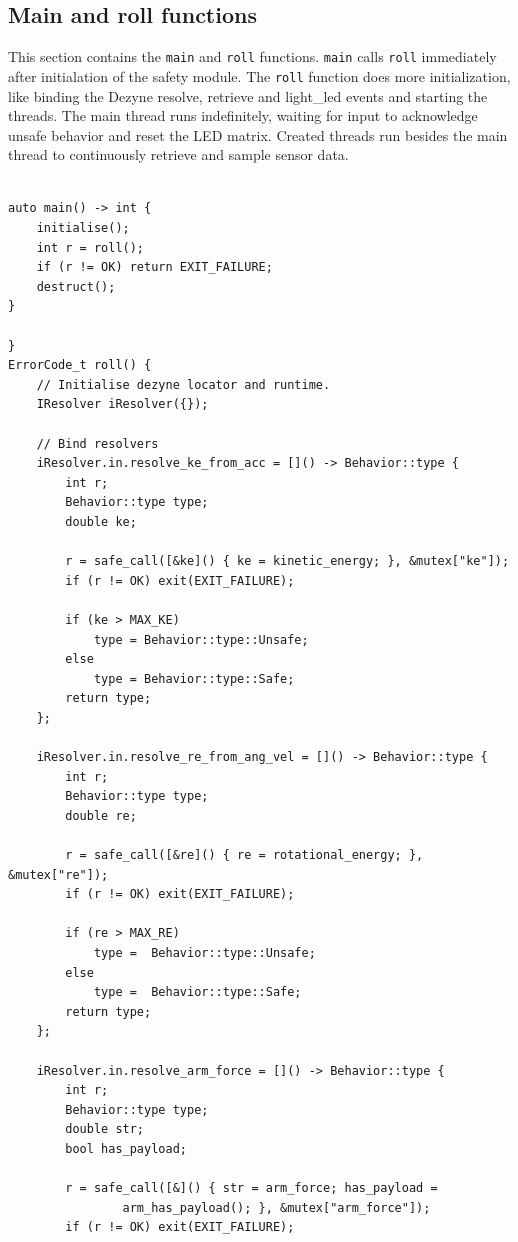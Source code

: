 \documentclass[12pt]{scrreprt}
\begin{document}
\begin{appendices}
\section{Main and roll functions}
\label{main and roll}
This section contains the \texttt{main} and \texttt{roll} functions. \texttt{main} calls \texttt{roll} immediately after initialation of the safety module. The \texttt{roll} function does more initialization, like binding the Dezyne resolve, retrieve and light\_led events and starting the threads. The main thread runs indefinitely, waiting for input to acknowledge unsafe behavior and reset the LED matrix. Created threads run besides the main thread to continuously retrieve and sample sensor data.
\begin{verbatim}
               
auto main() -> int {
    initialise();
    int r = roll();
    if (r != OK) return EXIT_FAILURE;
    destruct();
}

}
ErrorCode_t roll() {
    // Initialise dezyne locator and runtime.
    IResolver iResolver({});

    // Bind resolvers
    iResolver.in.resolve_ke_from_acc = []() -> Behavior::type {
        int r;
        Behavior::type type;
        double ke;

        r = safe_call([&ke]() { ke = kinetic_energy; }, &mutex["ke"]);
        if (r != OK) exit(EXIT_FAILURE);

        if (ke > MAX_KE)
            type = Behavior::type::Unsafe;
        else
            type = Behavior::type::Safe;
        return type;
    };

    iResolver.in.resolve_re_from_ang_vel = []() -> Behavior::type {
        int r;
        Behavior::type type;
        double re;

        r = safe_call([&re]() { re = rotational_energy; }, &mutex["re"]);
        if (r != OK) exit(EXIT_FAILURE);

        if (re > MAX_RE)
            type =  Behavior::type::Unsafe;
        else
            type =  Behavior::type::Safe;
        return type;
    };

    iResolver.in.resolve_arm_force = []() -> Behavior::type {
        int r;
        Behavior::type type;
        double str;
        bool has_payload;

        r = safe_call([&]() { str = arm_force; has_payload =
                arm_has_payload(); }, &mutex["arm_force"]);
        if (r != OK) exit(EXIT_FAILURE);


\end{verbatim}
\end{appendices}
\end{document}
